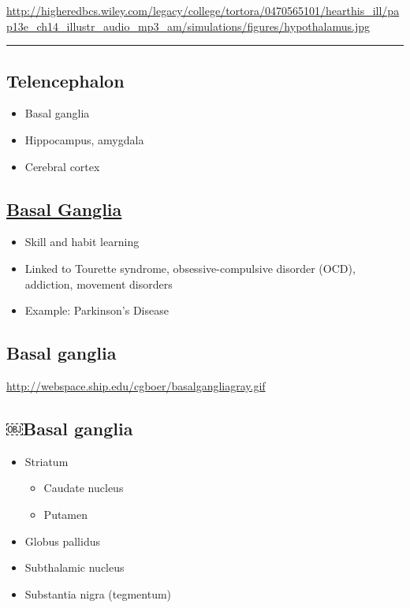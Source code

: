 \documentclass[]{article}
\providecommand{\tightlist}{%
  \setlength{\itemsep}{0pt}\setlength{\parskip}{0pt}}
\begin{document}
\url{http://higheredbcs.wiley.com/legacy/college/tortora/0470565101/hearthis_ill/pap13e_ch14_illustr_audio_mp3_am/simulations/figures/hypothalamus.jpg}

\begin{center}\rule{0.5\linewidth}{\linethickness}\end{center}

\subsection{Telencephalon}\label{telencephalon-1}

\begin{itemize}
\tightlist
\item
  Basal ganglia
\item
  Hippocampus, amygdala
\item
  Cerebral cortex
\end{itemize}

\subsection{\texorpdfstring{\href{https://en.wikipedia.org/wiki/Basal_ganglia}{Basal
Ganglia}}{Basal Ganglia}}\label{basal-ganglia}

\begin{itemize}
\tightlist
\item
  Skill and habit learning
\item
  Linked to Tourette syndrome, obsessive-compulsive disorder (OCD),
  addiction, movement disorders
\item
  Example: Parkinson's Disease
\end{itemize}

\subsection{Basal ganglia}\label{basal-ganglia-1}

\url{http://webspace.ship.edu/cgboer/basalgangliagray.gif}

\subsection{￼Basal ganglia}\label{basal-ganglia-2}

\begin{itemize}
\tightlist
\item
  Striatum

  \begin{itemize}
  \tightlist
  \item
    Caudate nucleus
  \item
    Putamen
  \end{itemize}
\item
  Globus pallidus
\item
  Subthalamic nucleus
\item
  Substantia nigra (tegmentum)
\end{itemize}
\end{document}
